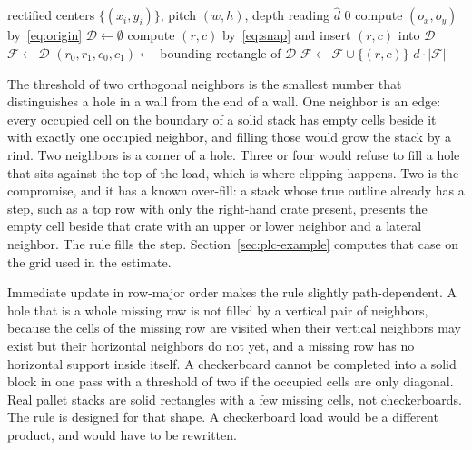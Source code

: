 \begin{algorithm}[t]
\caption{Perspective lattice completion on one frame}
\label{alg:plc}
\begin{algorithmic}[1]
\Require rectified centers $\{(x_i,y_i)\}$, pitch $(w,h)$, depth reading $\hat{d}$
  \State \Return $0$
\EndIf
\State compute $(o_x,o_y)$ by~\eqref{eq:origin}
\State $\mathcal{D}\gets\emptyset$
  \State compute $(r,c)$ by~\eqref{eq:snap} and insert $(r,c)$ into $\mathcal{D}$
\EndFor
\State $\mathcal{F}\gets\mathcal{D}$
\State $(r_0,r_1,c_0,c_1)\gets$ bounding rectangle of $\mathcal{D}$
      \State $\mathcal{F}\gets\mathcal{F}\cup\{(r,c)\}$
    \EndIf
  \EndFor
\EndFor
\State \Return $\hat{d}\cdot\lvert\mathcal{F}\rvert$
\end{algorithmic}
\end{algorithm}

The threshold of two orthogonal neighbors is the smallest number that distinguishes a hole in a wall from the end of a wall. One neighbor is an edge: every occupied cell on the boundary of a solid stack has empty cells beside it with exactly one occupied neighbor, and filling those would grow the stack by a rind. Two neighbors is a corner of a hole. Three or four would refuse to fill a hole that sits against the top of the load, which is where clipping happens. Two is the compromise, and it has a known over-fill: a stack whose true outline already has a step, such as a top row with only the right-hand crate present, presents the empty cell beside that crate with an upper or lower neighbor and a lateral neighbor. The rule fills the step. Section~\ref{sec:plc-example} computes that case on the grid used in the estimate.

Immediate update in row-major order makes the rule slightly path-dependent. A hole that is a whole missing row is not filled by a vertical pair of neighbors, because the cells of the missing row are visited when their vertical neighbors may exist but their horizontal neighbors do not yet, and a missing row has no horizontal support inside itself. A checkerboard cannot be completed into a solid block in one pass with a threshold of two if the occupied cells are only diagonal. Real pallet stacks are solid rectangles with a few missing cells, not checkerboards. The rule is designed for that shape. A checkerboard load would be a different product, and  would have to be rewritten.

